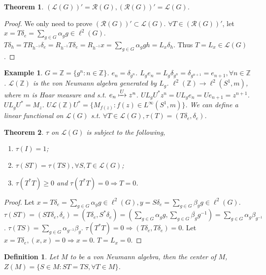\documentclass[12pt]{article}
\newtheorem{definition}{Definition}
\newtheorem{example}{Example}
\newtheorem{theorem}{Theorem}
\begin{document}
\begin{theorem}
$(\mathcal L(G))'=\mathcal R(G), (\mathcal R(G))'=\mathcal L(G)$.
\end{theorem}
\begin{proof}
We only need to prove $(\mathcal R(G))'\subset\mathcal L(G)$. $\forall T\in(\mathcal R(G))'$, let $x=T\delta_e=\sum_{g\in G}\alpha_gg\in\ell^2(G)$. $T\delta_h=TR_{h^{-1}}\delta_e=R_{h^{-1}}T\delta_e=R_{h^{-1}}x=\sum_{g\in G}\alpha_ggh=L_x\delta_h$. Thus $T=L_x\in\mathcal L(G)$.
\end{proof}

\begin{example}
$G=\mathbb Z=\{g^n:n\in\mathbb Z \}$. $e_n=\delta_{g^n}$. $L_ge_n=L_g\delta_{g^n}=\delta_{g^{n+1}}=e_{n+1},\forall n\in\mathbb Z$. $\mathcal L(\mathbb Z)$ is the von Neumann algebra generated by $L_g$. $\ell^2(\mathbb Z)\to\ell^2(S^1,m)$, where $m$ is Haar measure and s.t. $e_n\xmapsto[]{U}z^n$. $UL_gU^*z^n=UL_ge_n=Ue_{n+1}=z^{n+1}$. $UL_gU^*=M_z$. $U\mathcal L(\mathbb Z)U^*=\{M_{f(z)}:f(z)\in L^\infty(S^1,m) \}$. We can define a linear functional on $\mathcal L(G)$ s.t. $\forall T\in \mathcal L(G), \tau(T)=(T\delta_e,\delta_e)$.
\end{example}

\begin{theorem}
$\tau$ on $\mathcal L(G)$ is subject to the following,
\begin{enumerate}
	\item $\tau(I)=1$;
	\item $\tau(ST)=\tau(TS), \forall S, T\in \mathcal L(G)$;
	\item $\tau(T^*T)\ge 0$ and $\tau(T^*T)=0\Rightarrow T=0$.
\end{enumerate}
\end{theorem}
\begin{proof}
Let $x=T\delta_e=\sum_{g\in G}\alpha_gg\in\ell^2(G),y=S\delta_e=\sum_{g\in G}\beta_gg\in\ell^2(G)$. $\tau(ST)=(ST\delta_e,\delta_e)=(T\delta_e,S^*\delta_e)=\left(\sum_{g\in G}\alpha_gg,\sum_{g\in G}\overline{\beta_g}g^{-1} \right)=\sum_{g\in G}\alpha_g\beta_{g^{-1}}$. $\tau(TS)=\sum_{g\in G}\alpha_{g^{-1}}\beta_g$. $\tau(T^*T)=0\Rightarrow(T\delta_e,T\delta_e)=0$. Let $x=T\delta_e, (x,x)=0\Rightarrow x=0$. $T=L_x=0$. 
\end{proof}

\begin{definition}
Let $M$ to be a von Neumann algebra, then the center of $M$, $Z(M)=\{S\in M: ST=TS, \forall T\in M \}$.
\end{definition}
\end{document}
